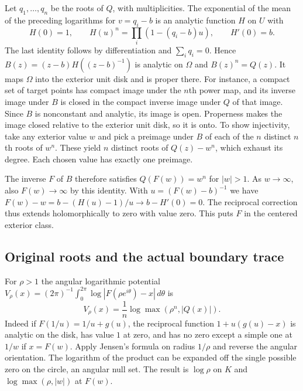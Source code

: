 \documentclass[11pt]{article}
\begin{document}
	Let $q_1,\ldots,q_n$ be the roots of $Q$, with multiplicities.
	The exponential of the mean of the preceding logarithms for
	$v=q_i-b$ is an analytic function $H$ on $U$ with
	\[
	H(0)=1,\qquad H(u)^n=\prod_i(1-(q_i-b)u),\qquad H'(0)=b.
	\]
	The last identity follows by differentiation and $\sum_i q_i=0$.
	Hence
	$B(z)=(z-b)H((z-b)^{-1})$ is analytic on $\Omega$ and $B(z)^n=Q(z)$.
	It maps $\Omega$ into the exterior unit disk and is proper there.
	For instance, a compact set of target points has compact image
	under the $n$th power map, and its inverse image under $B$ is
	closed in the compact inverse image under $Q$ of that image.
	Since $B$ is nonconstant and analytic, its image is open. Properness
	makes the image closed relative to the exterior unit disk, so it is
	onto. To show injectivity, take any exterior value $w$ and pick a
	preimage under $B$ of each of the $n$ distinct $n$th roots of $w^n$.
	These yield $n$ distinct roots of $Q(z)-w^n$, which exhaust its
	degree. Each chosen value has exactly one preimage.
	
	The inverse $F$ of $B$ therefore satisfies $Q(F(w))=w^n$ for $|w|>1$.
	As $w\to\infty$, also $F(w)\to\infty$ by this identity. With
	$u=(F(w)-b)^{-1}$ we have
	$F(w)-w=b-(H(u)-1)/u\to b-H'(0)=0$.
	The reciprocal correction thus extends holomorphically to zero
	with value zero. This puts $F$ in the centered exterior class.
	
	\subsection{Original roots and the actual boundary trace}
	\label{sec:smooth-exterior-potential}
	For $\rho>1$ the angular logarithmic potential
	$V_\rho(x)=(2\pi)^{-1}\int_0^{2\pi}
	\log|F(\rho e^{i\theta})-x|\,d\theta$ is
	\[
	V_\rho(x)=\frac1n\log\max(\rho^n,|Q(x)|).
	\]
	Indeed if $F(1/u)=1/u+g(u)$, the reciprocal function
	$1+u(g(u)-x)$ is analytic on the disk, has value $1$ at zero,
	and has no zero except a simple one at $1/w$ if $x=F(w)$.
	Apply Jensen's formula on radius $1/\rho$ and reverse the angular
	orientation. The logarithm of the product can be expanded off the
	single possible zero on the circle, an angular null set. The result
	is $\log\rho$ on $K$ and $\log\max(\rho,|w|)$ at $F(w)$.
	
\end{document}
